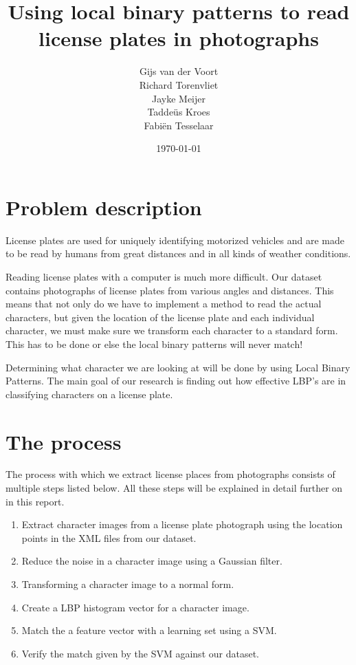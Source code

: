 \documentclass[a4paper]{article}
\date{\today}
\title{Using local binary patterns to read license plates in photographs}
\author{
    Gijs van der Voort\\
    Richard Torenvliet\\
    Jayke Meijer\\
    Tadde\"us Kroes\\
    Fabi\"en Tesselaar
}
\begin{document}
\maketitle
\thispagestyle{empty}
\newpage
\tableofcontents
\newpage


\section{Problem description}

License plates are used for uniquely identifying motorized vehicles and are made
to be read by humans from great distances and in all kinds of weather
conditions.

Reading license plates with a computer is much more difficult. Our dataset
contains photographs of license plates from various angles and distances. This
means that not only do we have to implement a method to read the actual
characters, but given the location of the license plate and each individual
character, we must make sure we transform each character to a standard form.
This has to be done or else the local binary patterns will never match!

Determining what character we are looking at will be done by using Local Binary
Patterns. The main goal of our research is finding out how effective LBP's are
in classifying characters on a license plate.


\section{The process}

The process with which we extract license places from photographs consists of
multiple steps listed below. All these steps will be explained in detail further
on in this report.

\begin{enumerate}
    \item Extract character images from a license plate photograph using the
          location points in the XML files from our dataset.
    \item Reduce the noise in a character image using a Gaussian filter.
    \item Transforming a character image to a normal form.
    \item Create a LBP histogram vector for a character image.
    \item Match the a feature vector with a learning set using a SVM.
    \item Verify the match given by the SVM against our dataset.
\end{enumerate}
\end{document}
